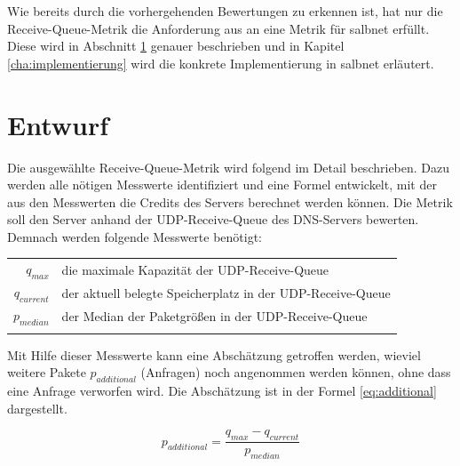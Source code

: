 \documentclass[a4paper, 12pt, BCOR10mm, DIV12, toc=bibliography, toc=listof, german]{scrbook}
\begin{document}

		Wie bereits durch die vorhergehenden Bewertungen zu erkennen ist, hat nur die Receive-Queue-Metrik die
		Anforderung aus \cite{scsczile2008} an eine Metrik für salbnet erfüllt. Diese wird in Abschnitt
		\ref{sec:entwurf} genauer beschrieben und in Kapitel \ref{cha:implementierung} wird die
		konkrete Implementierung in salbnet erläutert.


		\section{Entwurf} %
		\label{sec:entwurf}

		Die ausgewählte Receive-Queue-Metrik wird folgend im Detail beschrieben.  Dazu werden alle
		nötigen Messwerte identifiziert und eine Formel entwickelt, mit der aus den Messwerten die
		Credits des Servers berechnet werden können. Die Metrik soll den Server anhand der
		UDP-Receive-Queue des DNS-Servers bewerten. Demnach werden folgende Messwerte benötigt: $~$\\
		
		\begin{tabular}{rl}
			$q_{max}$		  & die maximale Kapazität der UDP-Receive-Queue\\
			$q_{current}$ &	der aktuell belegte Speicherplatz in der UDP-Receive-Queue\\
			$p_{median}$  &	der Median der Paketgrößen in der UDP-Receive-Queue\\
										& \\
		\end{tabular}

		Mit Hilfe dieser Messwerte kann eine Abschätzung getroffen werden, wieviel weitere Pakete
		$p_{additional}$ (Anfragen) noch angenommen werden können, ohne dass eine Anfrage verworfen wird.
		Die Abschätzung ist in der Formel \ref{eq:additional} dargestellt.

		\begin{equation}
			p_{additional} = \frac{q_{max} - q_{current}}{p_{median}}
			\label{eq:additional}
		\end{equation}
\end{document}
